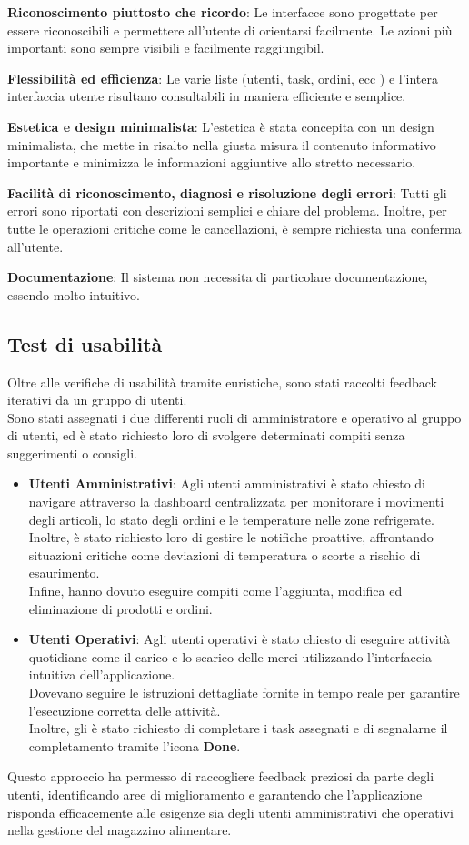 \textbf{Riconoscimento piuttosto che ricordo}: Le interfacce sono progettate per essere riconoscibili e permettere all’utente di orientarsi facilmente. Le azioni più importanti sono sempre visibili e facilmente raggiungibil.

\textbf{Flessibilità ed efficienza}: Le varie liste (utenti, task, ordini, ecc ) e l'intera interfaccia utente risultano consultabili in maniera efficiente e semplice.

\textbf{Estetica e design minimalista}: L’estetica è stata concepita con un design minimalista, che mette in risalto nella giusta misura il contenuto informativo importante e minimizza le informazioni aggiuntive allo stretto necessario.

\textbf{Facilità di riconoscimento, diagnosi e risoluzione degli errori}: Tutti gli errori sono riportati con descrizioni semplici e chiare del problema. Inoltre, per tutte le operazioni critiche come le cancellazioni, è sempre richiesta una conferma all’utente.

\textbf{Documentazione}: Il sistema non necessita di particolare documentazione, essendo molto intuitivo.

\subsection{Test di usabilità}
Oltre alle verifiche di usabilità tramite euristiche, sono stati raccolti feedback iterativi da un gruppo di utenti.\\
Sono stati assegnati i due differenti ruoli di amministratore e operativo al gruppo di utenti, ed è stato richiesto
loro di svolgere determinati compiti senza suggerimenti o consigli.\\

\begin{itemize}
    \item \textbf{Utenti Amministrativi}: Agli utenti amministrativi è stato chiesto di navigare attraverso la dashboard centralizzata per monitorare i movimenti degli articoli, lo stato degli ordini e le temperature nelle zone refrigerate.\\ Inoltre, è stato richiesto loro di gestire le notifiche proattive, affrontando situazioni critiche come deviazioni di temperatura o scorte a rischio di esaurimento.\\ Infine, hanno dovuto eseguire compiti come l'aggiunta, modifica ed eliminazione di prodotti e ordini.

    \item \textbf{Utenti Operativi}: Agli utenti operativi è stato chiesto di eseguire attività quotidiane come il carico e lo scarico delle merci utilizzando l'interfaccia intuitiva dell'applicazione.\\ Dovevano seguire le istruzioni dettagliate fornite in tempo reale per garantire l'esecuzione corretta delle attività.\\ Inoltre, gli è stato richiesto di completare i task assegnati e di segnalarne il completamento tramite l'icona \textbf{Done}.
\end{itemize}

Questo approccio ha permesso di raccogliere feedback preziosi da parte degli utenti, identificando aree di
miglioramento e garantendo che l'applicazione risponda efficacemente alle esigenze sia degli utenti amministrativi
che operativi nella gestione del magazzino alimentare.

